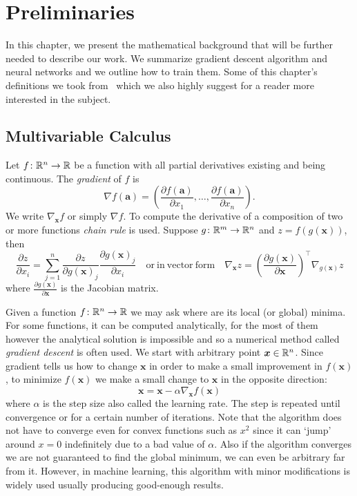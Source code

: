 \chapter{Preliminaries}\label{chap:preliminaries}


In this chapter, we present the mathematical background that will be further needed to describe our work. We summarize gradient descent algorithm and neural networks and we outline how to train them. Some of this chapter's definitions we took from~\cite{Goodfellow-et-al-2016} which we also highly suggest for a reader more interested in the subject.


\section{Multivariable Calculus}
Let $f\colon\mathbb{R}^n\to\mathbb{R}$ be a function with all partial derivatives existing and being continuous. The \textit{gradient} of $f$ is
\begin{equation*}
\nabla f(\bm{a})=\left(\frac{\partial f(\bm{a})}{\partial x_1},\dots,\frac{\partial f(\bm{a})}{\partial x_n}\right).
\end{equation*}
We write $\nabla_{\bm{x}} f$ or simply $\nabla f$.
To compute the derivative of a composition of two or more functions \textit{chain rule} is used. Suppose $g\colon\mathbb{R}^m\to\mathbb{R}^n$ and $z=f(g(\bm{x}))$, then
\begin{equation*}
\frac{\partial z}{\partial x_i}=\sum\limits_{j=1}^n\frac{\partial z}{\partial g(\bm{x})_j}\frac{\partial g(\bm{x})_j}{\partial x_i}\quad\mathrm{or\ in\ vector\ form}\quad\nabla_{\bm{x}}z=\left(\frac{\partial g(\bm{x})}{\partial\bm{x}}\right)^\top\nabla_{g(\bm{x})}z
\end{equation*}
where $\frac{\partial g(\bm{x})}{\partial\bm{x}}$ is the Jacobian matrix.

Given a function $f\colon\mathbb{R}^n\to\mathbb{R}$ we may ask where are its local (or global) minima. For some functions, it can be computed analytically, for the most of them however the analytical solution is impossible and so a numerical method called \textit{gradient descent} is often used. We start with arbitrary point $\bm{x}\in \mathbb{R}{^n}$. Since gradient tells us how to change $\bm{x}$ in order to make a small improvement in $f(\bm{x})$, to minimize $f(\bm{x})$ we make a small change to $\bm{x}$ in the opposite direction:
\begin{equation*}
\bm{x}=\bm{x}-\alpha\nabla_{\bm{x}}f(\bm{x})
\end{equation*}
where $\alpha$ is the step size also called the learning rate. The step is repeated until convergence or for a certain number of iterations. Note that the algorithm does not have to converge even for convex functions such as $x^2$ since it can `jump' around $x=0$ indefinitely due to a bad value of $\alpha$.
Also if the algorithm converges we are not guaranteed to find the global minimum, we can even be arbitrary far from it. However, in machine learning, this algorithm with minor modifications is widely used usually producing good-enough results.

